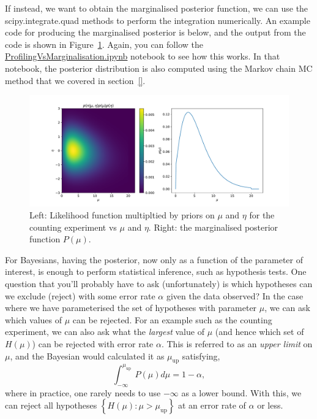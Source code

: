 If instead, we want to obtain the marginalised posterior function, we can use the \textsf{scipy.integrate.quad} methods to perform the integration numerically. An example code for producing the marginalised posterior is below, and the output from the code is shown in Figure~\ref{fig:marginalised_ex_counting}. Again, you can follow the \href{https://github.com/nucleosynthesis/PGStatistics/blob/main/notebooks/ProfilingVsMarginalisation.ipynb}{\textsf{ProfilingVsMarginalisation.ipynb}} notebook to see how this works. In that notebook, the posterior distribution is also computed using the Markov chain MC method that we covered in section~\ref{}. 


\begin{figure}[hbt!]
    \centering
    \includegraphics[width=\textwidth]{figures/Hypotest/marginalised_lh_ex.pdf}
    \caption{Left: Likelihood function multipltied by priors on $\mu$ and $\eta$ for the counting experiment vs $\mu$ and $\eta$.  Right: the marginalised posterior function $P(\mu)$.}
    \label{fig:marginalised_ex_counting}
\end{figure}

For Bayesians, having the posterior, now only as a function of the parameter of interest, is enough to perform statistical inference, such as hypothesis tests. One question that you'll probably have to ask (unfortunately) is which hypotheses can we exclude (reject) with some error rate $\alpha$ given the data observed? In the case where we have parameterised the set of hypotheses with parameter $\mu$, we can ask which values of $\mu$ can be rejected. For an example such as the counting experiment, we can also ask what the \emph{largest} value of $\mu$ (and hence which set of $H(\mu)$) can be rejected with error rate $\alpha$. This is referred to as an \emph{upper limit} on $\mu$, and the Bayesian would calculated it as $\mu_{\mathrm{up}}$ satisfying, 
\begin{equation}
    \int_{-\infty}^{\mu_{\mathrm{up}}}P(\mu)d\mu = 1-\alpha,
\end{equation}
where in practice, one rarely needs to use $-\infty$ as a lower bound. With this, we can reject all hypotheses $\left\{H(\mu):\mu>\mu_{\mathrm{up}}\right\}$ at an error rate of $\alpha$ or less. 

